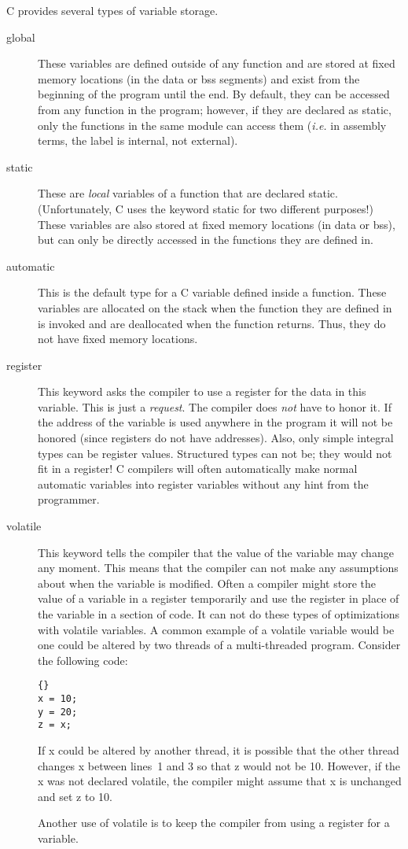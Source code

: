 C provides several types of variable storage.
\begin{description}
\item[global] 
These variables are defined outside of any function and
are stored at fixed memory locations (in the {\code data} or {\code
bss} segments) and exist from the beginning of the program until the
end. By default, they can be accessed from any function in the program;
however, if they are declared as {\code static}, only the functions in
the same module can access them (\emph{i.e.} in assembly terms, the
label is internal, not external).

\item[static] 
These are \emph{local} variables of a function that are
declared {\code static}. (Unfortunately, C uses the keyword {\code
static} for two different purposes!) These variables are also stored
at fixed memory locations (in {\code data} or {\code bss}), but can
only be directly accessed in the functions they are defined in. 

\item[automatic] 
This is the default type for a C variable defined inside a
function. These variables are allocated on the stack when the function
they are defined in is invoked and are deallocated when the function
returns. Thus, they do not have fixed memory locations.

\item[register] 
This keyword asks the compiler to use a register for
the data in this variable. This is just a \emph{request}. The compiler
does \emph{not} have to honor it. If the address of the variable is
used anywhere in the program it will not be honored (since registers
do not have addresses). Also, only simple integral types can be
register values.  Structured types can not be; they would not fit in a
register! C compilers will often automatically make normal automatic
variables into register variables without any hint from the programmer.

\item[volatile] 
This keyword tells the compiler that the value of the
variable may change any moment. This means that the compiler can not
make any assumptions about when the variable is modified. Often a
compiler might store the value of a variable in a register temporarily
and use the register in place of the variable in a section of code. It
can not do these types of optimizations with {\code volatile}
variables. A common example of a volatile variable would be one could
be altered by two threads of a multi-threaded program. Consider the 
following code:
\begin{lstlisting}{}
x = 10;
y = 20;
z = x;
\end{lstlisting}
If {\code x} could be altered by another thread, it is possible that the
other thread changes {\code x} between lines~1 and 3 so that {\code z}
would not be 10. However, if the {\code x} was not declared volatile, the
compiler might assume that {\code x} is unchanged and set {\code z} to 10.

Another use of {\code volatile} is to keep the compiler from using a
register for a variable. 

\end{description}
